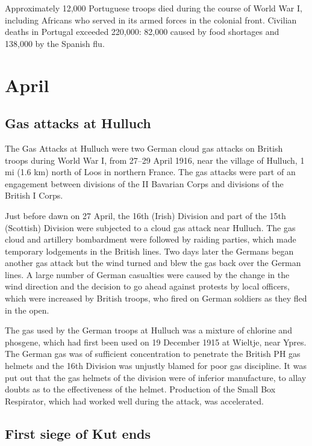 \documentclass[a4paper,]{book}
\begin{document}
Approximately 12,000 Portuguese troops died during the course of World War I, including Africans who served in its armed forces in the colonial front. Civilian deaths in Portugal exceeded 220,000: 82,000 caused by food shortages and 138,000 by the Spanish flu.


\chapter{April}

\section{Gas attacks at Hulluch}

The Gas Attacks at Hulluch were two German cloud gas attacks on British troops during World War I, from 27–29 April 1916, near the village of Hulluch, 1 mi (1.6 km) north of Loos in northern France. The gas attacks were part of an engagement between divisions of the II Bavarian Corps and divisions of the British I Corps.

Just before dawn on 27 April, the 16th (Irish) Division and part of the 15th (Scottish) Division were subjected to a cloud gas attack near Hulluch. The gas cloud and artillery bombardment were followed by raiding parties, which made temporary lodgements in the British lines. Two days later the Germans began another gas attack but the wind turned and blew the gas back over the German lines. A large number of German casualties were caused by the change in the wind direction and the decision to go ahead against protests by local officers, which were increased by British troops, who fired on German soldiers as they fled in the open.

The gas used by the German troops at Hulluch was a mixture of chlorine and phosgene, which had first been used on 19 December 1915 at Wieltje, near Ypres. The German gas was of sufficient concentration to penetrate the British PH gas helmets and the 16th Division was unjustly blamed for poor gas discipline. It was put out that the gas helmets of the division were of inferior manufacture, to allay doubts as to the effectiveness of the helmet. Production of the Small Box Respirator, which had worked well during the attack, was accelerated. 

\section{First siege of Kut ends}
\end{document}
